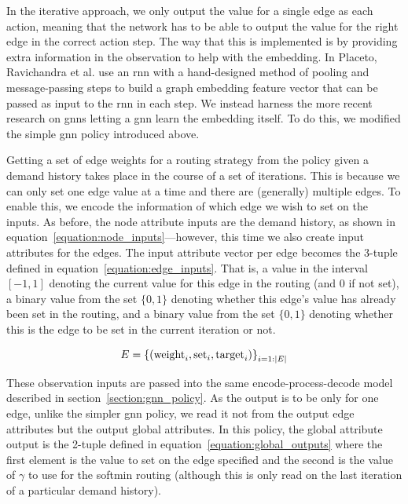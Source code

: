 In the iterative approach, we only output the value for a single edge as each action, meaning that the network has to be able to output the value for the right edge in the correct action step. The way that this is implemented is by providing extra information in the observation to help with the embedding. In Placeto, Ravichandra et al. use an \acf{rnn} with a hand-designed method of pooling and message-passing steps to build a graph embedding feature vector that can be passed as input to the \ac{rnn} in each step. We instead harness the more recent research on \acp{gnn} letting a \ac{gnn} learn the embedding itself. To do this, we modified the simple \ac{gnn} policy introduced above.

Getting a set of edge weights for a routing strategy from the policy given a demand history takes place in the course of a set of iterations. This is because we can only set one edge value at a time and there are (generally) multiple edges. To enable this, we encode the information of which edge we wish to set on the inputs. As before, the node attribute inputs are the demand history, as shown in equation~\ref{equation:node_inputs}---however, this time we also create input attributes for the edges. The input attribute vector per edge becomes the 3-tuple defined in equation~\ref{equation:edge_inputs}. That is, a value in the interval $[-1,1]$ denoting the current value for this edge in the routing (and 0 if not set), a binary value from the set $\{0,1\}$ denoting whether this edge's value has already been set in the routing, and a binary value from the set $\{0,1\}$ denoting whether this is the edge to be set in the current iteration or not.

\begin{equation}
  \label{equation:edge_inputs}
  E = \left\{ (\operatorname{weight}_i, \operatorname{set\vphantom{_i}}_i, \operatorname{target}_i) \right\}_{i=1:|E|}
\end{equation}

These observation inputs are passed into the same encode-process-decode model described in section~\ref{section:gnn_policy}. As the output is to be only for one edge, unlike the simpler \ac{gnn} policy, we read it not from the output edge attributes but the output global attributes. In this policy, the global attribute output is the 2-tuple defined in equation~\ref{equation:global_outputs} where the first element is the value to set on the edge specified and the second is the value of $\gamma$ to use for the softmin routing (although this is only read on the last iteration of a particular demand history).

